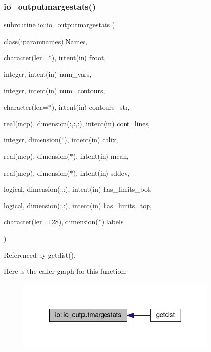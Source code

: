 \subsubsection{\texorpdfstring{io\+\_\+outputmargestats()}{io\_outputmargestats()}}
{\footnotesize\ttfamily subroutine io\+::io\+\_\+outputmargestats (\begin{DoxyParamCaption}\item[{class(tparamnames)}]{Names,  }\item[{character(len=$\ast$), intent(in)}]{froot,  }\item[{integer, intent(in)}]{num\+\_\+vars,  }\item[{integer, intent(in)}]{num\+\_\+contours,  }\item[{character(len=$\ast$), intent(in)}]{contours\+\_\+str,  }\item[{real(mcp), dimension(\+:,\+:,\+:), intent(in)}]{cont\+\_\+lines,  }\item[{integer, dimension($\ast$), intent(in)}]{colix,  }\item[{real(mcp), dimension($\ast$), intent(in)}]{mean,  }\item[{real(mcp), dimension($\ast$), intent(in)}]{sddev,  }\item[{logical, dimension(\+:,\+:), intent(in)}]{has\+\_\+limits\+\_\+bot,  }\item[{logical, dimension(\+:,\+:), intent(in)}]{has\+\_\+limits\+\_\+top,  }\item[{character(len=128), dimension($\ast$)}]{labels }\end{DoxyParamCaption})}



Referenced by getdist().

Here is the caller graph for this function\+:
\nopagebreak
\begin{figure}[H]
\begin{center}
\leavevmode
\includegraphics[width=282pt]{namespaceio_a4e9e0bbb9fe4d25b43fe615489cdf0a2_icgraph}
\end{center}
\end{figure}
\mbox{\label{namespaceio_aa16f5fbf54e4430bea5bda0c8ab2f40e}} 
